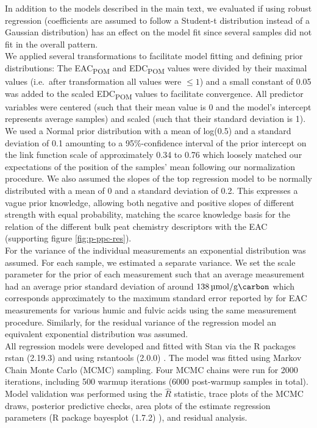 \documentclass[draft,linenumbers]{agujournal2018}
\begin{document}
In addition to the models described in the main text, we evaluated if
using robust regression (coefficients are assumed to follow a Student-t
distribution instead of a Gaussian distribution) has an effect on the
model fit since several samples did not fit in the overall pattern.\\
We applied several transformations to facilitate model fitting and
defining prior distributions: The EAC\textsubscript{POM} and
EDC\textsubscript{POM} values were divided by their maximal values
(i.e.~after transformation all values were \(\le1\)) and a small
constant of 0.05 was added to the scaled EDC\textsubscript{POM} values
to facilitate convergence. All predictor variables were centered (such
that their mean value is 0 and the model's intercept represents average
samples) and scaled (such that their standard deviation is 1).\\
We used a Normal prior distribution with a mean of log(0.5) and a
standard deviation of 0.1 amounting to a 95\%-confidence interval of the
prior intercept on the link function scale of approximately 0.34 to 0.76
which loosely matched our expectations of the position of the samples'
mean following our normalization procedure. We also assumed the slopes
of the top regression model to be normally distributed with a mean of 0
and a standard deviation of 0.2. This expresses a vague prior knowledge,
allowing both negative and positive slopes of different strength with
equal probability, matching the scarce knowledge basis for the relation
of the different bulk peat chemistry descriptors with the EAC
(supporting figure \ref{fig:p-ppc-res}).\\
For the variance of the individual measurements an exponential
distribution was assumed. For each sample, we estimated a separate
variance. We set the scale parameter for the prior of each measurement
such that an average measurement had an average prior standard deviation
of around \(\SI{138}{\micro\mol\per\g\carbon}\) which corresponds
approximately to the maximum standard error reported by
\citet{Aeschbacher.2012} for EAC measurements for various humic and
fulvic acids using the same measurement procedure. Similarly, for the
residual variance of the regression model an equivalent exponential
distribution was assumed.\\
All regression models were developed and fitted with Stan
\citep{Carpenter.2017} via the R packages rstan (2.19.3)
\citep{StanDevelopmentTeam.2020} and using rstantools (2.0.0)
\citep{Gabry.2019b}. The model was fitted using Markov Chain Monte Carlo
(MCMC) sampling. Four MCMC chains were run for 2000 iterations,
including 500 warmup iterations (6000 post-warmup samples in total).
Model validation was performed using the \(\hat{R}\) statistic, trace
plots of the MCMC draws, posterior predictive checks, area plots of the
estimate regression parameters \citep{Gelman.2014b, Gabry.2019} (R
package bayesplot (1.7.2) \citep{Gabry.2019}), and residual analysis.
\end{document}

